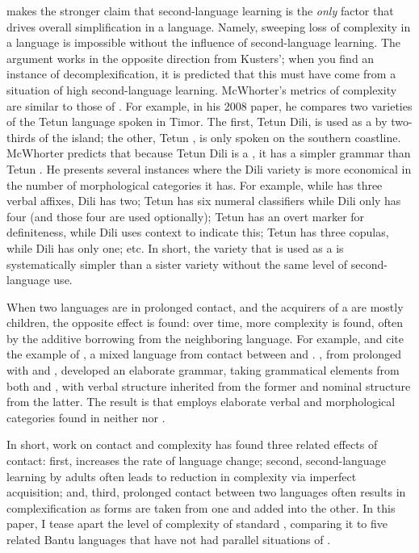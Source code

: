 \documentclass[output=paper,
modfonts
]{langscibook}
\begin{document}
 
\citet{McWhorter2011,McWhorter2008} makes the stronger claim that second-language learning is the \emph{only} factor that drives overall simplification in a language. Namely, sweeping loss of complexity in a language is impossible without the influence of second-language learning. The argument works in the opposite direction from Kusters'; when you find an instance of decomplexification, it is predicted that this must have come from a situation of high second-language learning.
  McWhorter's metrics of complexity are similar to those of \citet{Kusters2003fate}. For example, in his 2008 paper, he compares two varieties of the Tetun language spoken in Timor. The first, Tetun Dili, is used as a  by two-thirds of the island; the other, Tetun , is only spoken on the southern coastline. McWhorter predicts that because Tetun Dili is a , it has a simpler grammar than Tetun . He presents several instances where the Dili variety is more economical in the number of morphological categories it has. For example, while  has three verbal affixes, Dili has two; Tetun has six numeral classifiers while Dili only has four (and those four are used optionally); Tetun has an overt marker for definiteness, while Dili uses context to indicate this; Tetun has three copulas, while Dili has only one; etc. In short, the variety that is used as a  is systematically simpler than a sister variety without the same level of second-language use. 
  
 When two languages are in prolonged contact, and the acquirers of a  are mostly children, the opposite effect is found: over time, more complexity is found, often by the additive borrowing from the neighboring language. For example, \citet{Comrie2008} and \citet{Trudgill2011} cite the example of , a mixed language from contact between  and  \citep{Bakker1997}.  , from prolonged  with  and , developed an elaborate grammar, taking grammatical elements from both  and , with verbal structure inherited from the former and nominal structure from the latter. The result is that  employs elaborate verbal and morphological categories found in neither  nor . 
 
In short, work on contact and complexity has found three related effects of contact: first,  increases the rate of language change; second, second-language learning by adults often leads to reduction in complexity via imperfect acquisition; and, third, prolonged contact between two languages often results in complexification as forms are taken from one and added into the other.  In this paper, I tease apart the level of complexity of standard , comparing it to five related Bantu languages that have not had parallel situations of . 
 
\end{document}
